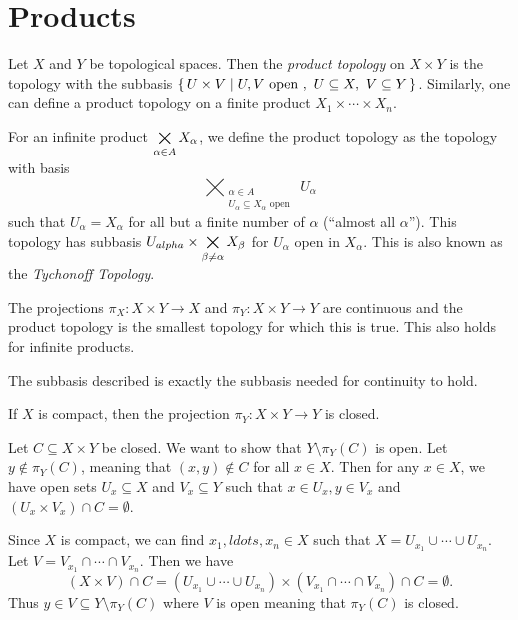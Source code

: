 \documentclass[letterpaper, 11pt]{article}
\begin{document}
\clearpage

\section{Products}

\begin{defn}
  Let $X$ and $Y$ be topological spaces.
  Then the \emph{product topology} on $X \times Y$ is the topology with the subbasis $\set{U \times V | U, V \text{ open },~ U \subseteq X,~ V \subseteq Y}$.
  Similarly, one can define a product topology on a finite product $X_{1} \times \cdots \times X_{n}$.

  For an infinite product $\bigtimes\limits_{\alpha \in A} X_{\alpha}$, we define the product topology as the topology with basis
  \[
    \bigtimes_{\substack{\alpha \in A \\ U_{\alpha} \subseteq X_{\alpha} \text{ open }}} U_{\alpha}
  \]
  such that $U_{\alpha} = X_{\alpha}$ for all but a finite number of $\alpha$ (``almost all $\alpha$'').
  This topology has subbasis $U_{alpha} \times \bigtimes\limits_{\beta \neq \alpha} X_{\beta}$ for $U_{\alpha}$ open in $X_{\alpha}$.
  This is also known as the \emph{Tychonoff Topology}.
\end{defn}

\begin{prop}
  The projections $\pi_{X}\colon X \times Y \to X$ and $\pi_{Y}\colon X \times Y \to Y$ are continuous and the product topology is the smallest topology for which this is true.
  This also holds for infinite products.
\end{prop}
\begin{pf}
  The subbasis described is exactly the subbasis needed for continuity to hold.
\end{pf}

\begin{prop}\label{prop: compact_proj_closed}
  If $X$ is compact, then the projection $\pi_{Y}\colon X \times Y \to Y$ is closed.
\end{prop}
\begin{pf}
  Let $C \subseteq X \times Y$ be closed.
  We want to show that $Y \setminus \pi_{Y}(C)$ is open.
  Let $y \notin \pi_{Y}(C)$, meaning that $(x, y) \notin C$ for all $x \in X$.
  Then for any $x \in X$, we have open sets $U_{x} \subseteq X$ and $V_{x} \subseteq Y$ such that $x \in U_{x}, y \in V_{x}$ and $(U_{x} \times V_{x}) \cap C = \emptyset$.

  Since $X$ is compact, we can find $x_{1}, ldots, x_{n} \in X$ such that $X = U_{x_{1}} \cup \cdots \cup U_{x_{n}}$.
  Let $V = V_{x_{1}} \cap \cdots \cap V_{x_{n}}$.
  Then we have
  \[
    (X \times V) \cap C = ( U_{x_{1}} \cup \cdots \cup U_{x_{n}} ) \times ( V_{x_{1}} \cap \cdots \cap V_{x_{n}} ) \cap C = \emptyset.
  \]
  Thus $y \in V \subseteq Y \setminus \pi_{Y}(C)$ where $V$ is open meaning that $\pi_{Y}(C)$ is closed.
\end{pf}
\end{document}
